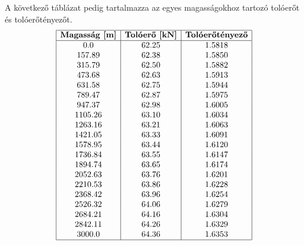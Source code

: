 \documentclass[a4paper,12pt]{article}
\begin{document}
A következő táblázat pedig tartalmazza az egyes magasságokhoz tartozó tolóerőt és tolóerőtényezőt.
\[
\begin{array}{|c|c|c|}
\hline
\textbf{Magasság [m]} & \textbf{Tolóerő [kN]} & \textbf{Tolóerőtényező} \\
\hline
0.0 & 62.25 & 1.5818 \\
157.89 & 62.38 & 1.5850 \\
315.79 & 62.50 & 1.5882 \\
473.68 & 62.63 & 1.5913 \\
631.58 & 62.75 & 1.5944 \\
789.47 & 62.87 & 1.5975 \\
947.37 & 62.98 & 1.6005 \\
1105.26 & 63.10 & 1.6034 \\
1263.16 & 63.21 & 1.6063 \\
1421.05 & 63.33 & 1.6091 \\
1578.95 & 63.44 & 1.6120 \\
1736.84 & 63.55 & 1.6147 \\
1894.74 & 63.65 & 1.6174 \\
2052.63 & 63.76 & 1.6201 \\
2210.53 & 63.86 & 1.6228 \\
2368.42 & 63.96 & 1.6254 \\
2526.32 & 64.06 & 1.6279 \\
2684.21 & 64.16 & 1.6304 \\
2842.11 & 64.26 & 1.6329 \\
3000.0 & 64.36 & 1.6353 \\
\hline
\end{array}
\]
\end{document}
